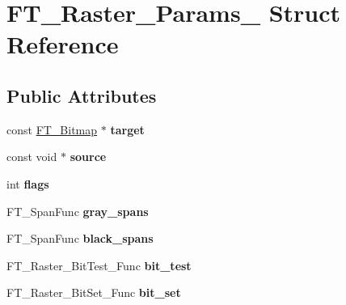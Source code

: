 \hypertarget{struct_f_t___raster___params__}{\section{F\-T\-\_\-\-Raster\-\_\-\-Params\-\_\- Struct Reference}
\label{struct_f_t___raster___params__}
}
\subsection*{Public Attributes}
\begin{DoxyCompactItemize}
\item 
\hypertarget{struct_f_t___raster___params___a2ba8941740db23ec91302aa9bd154da3}{const \hyperlink{struct_f_t___bitmap__}{F\-T\-\_\-\-Bitmap} $\ast$ {\bfseries target}}\label{struct_f_t___raster___params___a2ba8941740db23ec91302aa9bd154da3}

\item 
\hypertarget{struct_f_t___raster___params___a9be95865384791b018f7a9665a062ee5}{const void $\ast$ {\bfseries source}}\label{struct_f_t___raster___params___a9be95865384791b018f7a9665a062ee5}

\item 
\hypertarget{struct_f_t___raster___params___a1a28ab69b8296b4378886d1a2b57d333}{int {\bfseries flags}}\label{struct_f_t___raster___params___a1a28ab69b8296b4378886d1a2b57d333}

\item 
\hypertarget{struct_f_t___raster___params___a456191f1944775933e3d9d36c8632c35}{F\-T\-\_\-\-Span\-Func {\bfseries gray\-\_\-spans}}\label{struct_f_t___raster___params___a456191f1944775933e3d9d36c8632c35}

\item 
\hypertarget{struct_f_t___raster___params___a42c30e60ad5e243cf78833232e052b47}{F\-T\-\_\-\-Span\-Func {\bfseries black\-\_\-spans}}\label{struct_f_t___raster___params___a42c30e60ad5e243cf78833232e052b47}

\item 
\hypertarget{struct_f_t___raster___params___aff3c1a2a7eda24136a46715128d24ed6}{F\-T\-\_\-\-Raster\-\_\-\-Bit\-Test\-\_\-\-Func {\bfseries bit\-\_\-test}}\label{struct_f_t___raster___params___aff3c1a2a7eda24136a46715128d24ed6}

\item 
\hypertarget{struct_f_t___raster___params___ac66c3c44fcb63c254a46170d85d653c0}{F\-T\-\_\-\-Raster\-\_\-\-Bit\-Set\-\_\-\-Func {\bfseries bit\-\_\-set}}\label{struct_f_t___raster___params___ac66c3c44fcb63c254a46170d85d653c0}


\end{DoxyCompactItemize}

